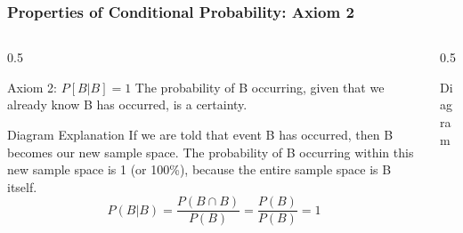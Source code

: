 \begin{frame}
    \frametitle{Properties of Conditional Probability: Axiom 2}
    
    \begin{columns}[T]
        \begin{column}{0.5\textwidth}
            \begin{block}{Axiom 2: \(P[B|B] = 1\)}
                The probability of B occurring, given that we already know B has occurred, is a certainty.
            \end{block}
            
            \begin{block}{Diagram Explanation}
                If we are told that event B has occurred, then B becomes our new sample space. The probability of B occurring within this new sample space is 1 (or 100\%), because the entire sample space is B itself.
                \[ P(B|B) = \frac{P(B \cap B)}{P(B)} = \frac{P(B)}{P(B)} = 1 \]
            \end{block}
        \end{column}
        
        \begin{column}{0.5\textwidth}
            \begin{block}{Diagram}
                \centering
            \end{block}
        \end{column}
    \end{columns}
\end{frame}

